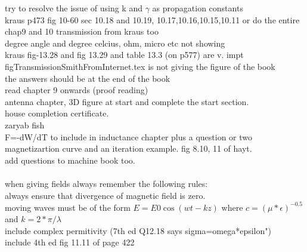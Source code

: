 \begin{otherlanguage}{english}
try to resolve the issue of using k and $\gamma$ as propagation constants\\
kraus p473 fig 10-60 sec 10.18 and 10.19, 10.17,10.16,10.15,10.11 or do the entire chap9 and 10  transmission from kraus too\\
degree angle and degree celcius, ohm, micro etc not showing\\
kraus fig-13.28 and fig 13.29 and table 13.3 (on p577) are v. impt\\
figTransmissionSmithFromInternet.tex is not giving the figure of the book\\
the answers should be at the end of the book\\
read chapter 9 onwards (proof reading)\\
antenna chapter, 3D figure at start and complete the start section.\\
house completion certificate.\\
zaryab fish\\
F=-dW/dT to include in inductance chapter plus a question or two\\
magnetizartion curve and an iteration example. fig 8.10, 11 of hayt.\\
add questions to machine book too.\\
\\
when giving fields always remember the following rules:\\
always ensure that divergence of magnetic field is zero.\\
moving waves must be of the form $E=E0 \cos(wt-kz)$ where $c=(\mu*\epsilon)^{-0.5}$ and $k=2*\pi/\lambda$\\
include complex permitivity  (7th ed Q12.18 says sigma=omega*epsilon")\\
include 4th ed fig 11.11 of page 422
\end{otherlanguage}
